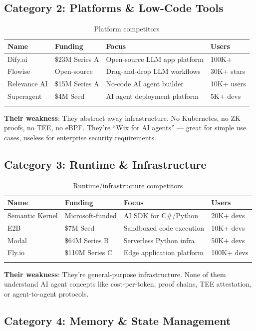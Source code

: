 \documentclass[12pt,a4paper,openany]{report}
\begin{document}
\subsection{Category 2: Platforms \& Low-Code Tools}

\begin{longtable}{p{3cm}p{3cm}p{4cm}p{3cm}}
\toprule
\textbf{Name} & \textbf{Funding} & \textbf{Focus} & \textbf{Users} \\
\midrule
Dify.ai & \$23M Series A & Open-source LLM app platform & 100K+ \\
Flowise & Open-source & Drag-and-drop LLM workflows & 30K+ stars \\
Relevance AI & \$15M Series A & No-code AI agent builder & 10K+ users \\
Superagent & \$4M Seed & AI agent deployment platform & 5K+ devs \\
\bottomrule
\caption{Platform competitors}
\end{longtable}

\textbf{Their weakness}: They abstract away infrastructure. No Kubernetes, no ZK proofs, no TEE, no eBPF. They're ``Wix for AI agents'' — great for simple use cases, useless for enterprise security requirements.

\subsection{Category 3: Runtime \& Infrastructure}

\begin{longtable}{p{3cm}p{3cm}p{4cm}p{3cm}}
\toprule
\textbf{Name} & \textbf{Funding} & \textbf{Focus} & \textbf{Users} \\
\midrule
Semantic Kernel & Microsoft-funded & AI SDK for C\#/Python & 20K+ devs \\
E2B & \$7M Seed & Sandboxed code execution & 10K+ devs \\
Modal & \$64M Series B & Serverless Python infra & 50K+ devs \\
Fly.io & \$110M Series C & Edge application platform & 100K+ devs \\
\bottomrule
\caption{Runtime/infrastructure competitors}
\end{longtable}

\textbf{Their weakness}: They're general-purpose infrastructure. None of them understand AI agent concepts like cost-per-token, proof chains, TEE attestation, or agent-to-agent protocols.

\subsection{Category 4: Memory \& State Management}
\end{document}
